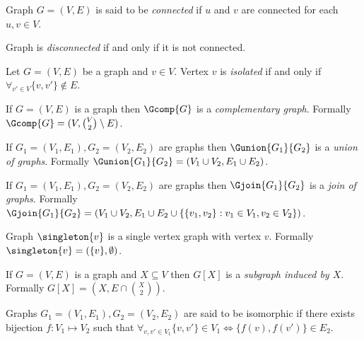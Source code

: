 \begin{defi}
    Graph $G = (V,E)$ is said to be \emph{connected} if $u$ and $v$ are connected for each $u,v \in V$.

    Graph is \emph{disconnected} if and only if it is not connected.
\end{defi}

\begin{defi}
    Let $G = (V,E)$ be a graph and $v \in V$. Vertex $v$ is \emph{isolated} if and only if $\forall_{v' \in V} \{v,v'\} \not\in E$.
\end{defi}

\begin{defi}
    If $G = (V, E)$ is a graph then $\Gcomp{G}$ is a \emph{complementary graph}. Formally $\Gcomp{G} = (V, \binom{V}{2} \setminus E)$.
\end{defi}
\begin{defi}
    If $G_1 = (V_1, E_1), G_2 = (V_2, E_2)$ are graphs then $\Gunion{G_1}{G_2}$ is a \emph{union of graphs}. Formally $\Gunion{G_1}{G_2} = (V_1 \cup V_2, E_1 \cup E_2)$.
\end{defi}
\begin{defi}
    If $G_1 = (V_1, E_1), G_2 = (V_2, E_2)$ are graphs then $\Gjoin{G_1}{G_2}$ is a \emph{join of graphs}. Formally $\Gjoin{G_1}{G_2} = (V_1 \cup V_2, E_1 \cup E_2 \cup \{\{v_1,v_2\} : v_1 \in V_1, v_2 \in V_2\})$.
\end{defi}

\begin{defi}
    Graph $\singleton{v}$ is a single vertex graph with vertex $v$. Formally $\singleton{v} = (\{v\}, \emptyset)$.
\end{defi}

\begin{defi}
    If $G = (V,E)$ is a graph and $X \subseteq V$ then $G[X]$ is a \emph{subgraph induced by $X$}. Formally $G[X] = (X, E \cap \binom{X}{2})$.
\end{defi}

\begin{defi}
    Graphs $G_1 = (V_1, E_1), G_2 = (V_2, E_2)$ are said to be isomorphic if there exists bijection $f\colon V_1 \mapsto V_2$ such that $\forall_{v, v' \in V_1} \{v,v'\} \in V_1 \iff \{f(v), f(v')\} \in E_2$.
\end{defi}


